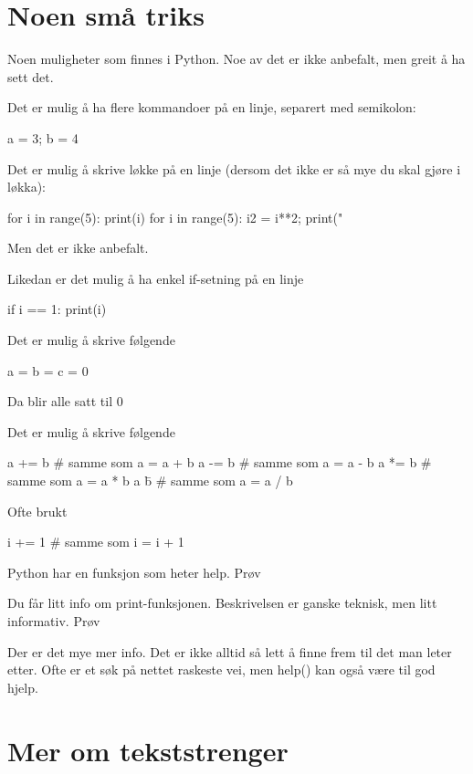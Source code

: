 \section{Noen små triks}

Noen muligheter som finnes i Python. Noe av det er ikke anbefalt, men greit å ha sett det. 

Det er mulig å ha flere kommandoer på en linje, separert med semikolon:
\begin{usncodebox}
a = 3; b = 4
\end{usncodebox}

Det er mulig å skrive løkke på en linje (dersom det ikke er så mye du skal gjøre i løkka):
\begin{usncodebox}
for i in range(5): print(i)
for i in range(5): i2 = i**2; print("%
\end{usncodebox}

Men det er ikke anbefalt. 

Likedan er det mulig å ha enkel if-setning på en linje
\begin{usncodebox}
if i == 1: print(i)
\end{usncodebox}

Det er mulig å skrive følgende
\begin{usncodebox}
a = b = c = 0
\end{usncodebox}
Da blir alle satt til 0

Det er mulig å skrive følgende
\begin{usncodebox}
a += b    # samme som a = a + b
a -= b    # samme som a = a - b
a *= b    # samme som a = a * b
a \= b    # samme som a = a / b
\end{usncodebox}

Ofte brukt 
\begin{usncodebox}
i += 1    # samme som i = i + 1
\end{usncodebox}

Python har en funksjon som heter help. Prøv 

Du får litt info om print-funksjonen. Beskrivelsen er ganske teknisk, men litt informativ.
Prøv 

Der er det mye mer info. Det er ikke alltid så lett å finne frem til det man leter etter. Ofte er et søk på nettet raskeste vei, men help() kan også være til god hjelp. 

\section{Mer om tekststrenger}

